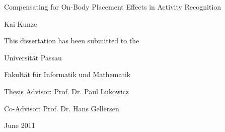 \documentclass[11pt, a4paper]{memoir}
\begin{document}
\pagestyle{empty}
\begin{flushleft}
\medskip 
\medskip 
\HUGE\textrm{Compensating for On-Body Placement Effects in Activity Recognition}\par
\end{flushleft}
\medskip
\begin{flushright}
{Kai Kunze}\par
\end{flushright}
\vspace*{290pt}
\begin{flushleft}\par
\textrm{This dissertation has been submitted to the}\par
\textrm{Universit\"at Passau}\par
\textrm{Fakult\"at f\"ur Informatik und Mathematik}\par
Thesis Advisor: Prof. Dr. Paul Lukowicz \par
Co-Advisor: Prof. Dr. Hans Gellersen
\end{flushleft}
\vspace*{\fill}
\begin{flushright}
June 2011
\end{flushright}
\clearpage
\pagestyle{empty}
\vspace*{240pt}
\end{document}
